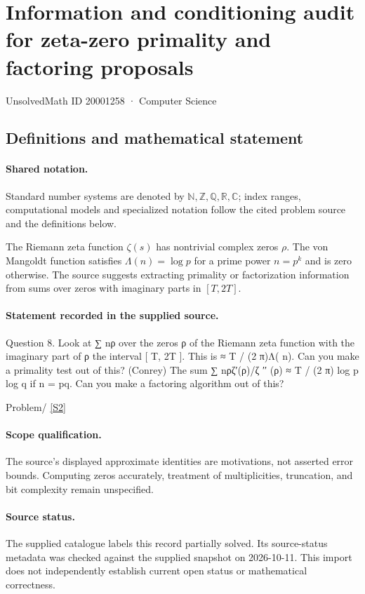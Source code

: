 \documentclass[11pt]{article}
\newcommand{\sref}[2]{\hyperlink{source:#1:#2}{[S#2]}}
\begin{document}
\setcounter{section}{20001257}
\section{Information and conditioning audit for zeta-zero primality and factoring proposals}\label{20001258}
{\small\sffamily UnsolvedMath ID 20001258 · Computer Science}
\subsection{Definitions and mathematical statement}

\paragraph{Shared notation.}Standard number systems are denoted by $\mathbb N,\mathbb Z,\mathbb Q,\mathbb R,\mathbb C$; index ranges, computational models and specialized notation follow the cited problem source and the definitions below.


The Riemann zeta function $\zeta(s)$ has nontrivial complex zeros $\rho$. The von Mangoldt function satisfies $\Lambda(n)=\log p$ for a prime power $n=p^k$ and is zero otherwise. The source suggests extracting primality or factorization information from sums over zeros with imaginary parts in $[T,2T]$.
\paragraph{Statement recorded in the supplied source.}
Question 8. Look at ∑ nρ over the zeros ρ of the Riemann zeta function with the imaginary part of ρ the interval [ T, 2T ]. This is ≈ T / (2 π)Λ( n). Can you make a primality test out of this? (Conrey) The sum ∑ nρζ′(ρ)/ζ ′′ (ρ) ≈ T / (2 π) log p log q if n = pq. Can you make a factoring algorithm out of this?

Problem/ \sref{20001258}{2}
\paragraph{Scope qualification.}
The source's displayed approximate identities are motivations, not asserted error bounds. Computing zeros accurately, treatment of multiplicities, truncation, and bit complexity remain unspecified.
\paragraph{Source status.}
The supplied catalogue labels this record partially solved. Its source-status metadata was checked against the supplied snapshot on 2026-10-11. This import does not independently establish current open status or mathematical correctness.
\end{document}
